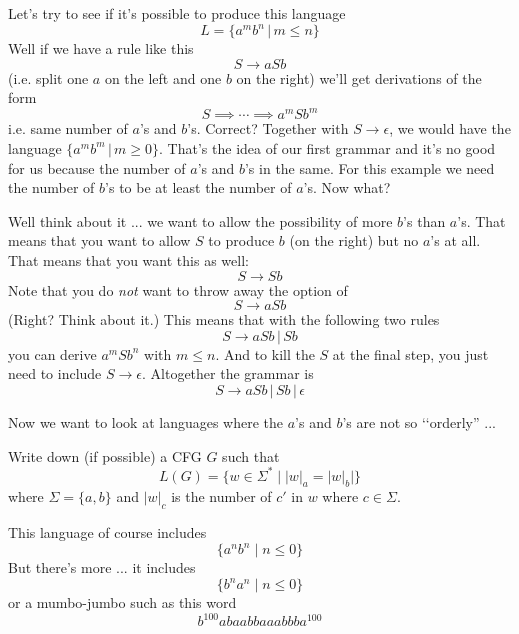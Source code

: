 \newpage
\begin{eg}
Let's try to see if it's possible to produce this language
\[
L = \{a^m b^n \,|\, m \leq n\}
\]
Well if we have a rule like this
\[
S \rightarrow aSb
\]
(i.e. split one $a$ on the left and one $b$ on the right) we'll get
derivations of the form
\[
S \implies \cdots \implies a^mSb^m
\]
i.e. same number of $a$'s and $b$'s. 
Correct?
Together with $S \rightarrow \epsilon$, we would have the language
$\{a^mb^m \,|\, m \geq 0\}$.
That's the idea of our first grammar and
it's no good for us because the number of $a$'s and $b$'s
in the same. For this example we need the number of $b$'s to be
at least the number of $a$'s.
Now what?

Well think about it ... we want to allow the possibility of more $b$'s
than $a$'s.
That means that you want to allow $S$ to produce $b$ (on the right)
but no $a$'s at all.
That means that you want this as well:
\[
S \rightarrow Sb
\]
Note that you do \textit{ not} want to throw away the option of 
\[
S \rightarrow aSb
\]
(Right? Think about it.)
This means that with the following two rules
\[
S \rightarrow aSb \,|\, Sb
\]
you can derive $a^mSb^n$ with $m \leq n$.
And to kill the $S$ at the final step,
you just need to include $S \rightarrow \epsilon$.
Altogether the grammar is 
\[
S \rightarrow aSb \,|\, Sb \,|\, \epsilon
\]
\end{eg}





\vspace{2in}




\vspace{2in}


\vspace{2in}

\newpage
Now we want to look at languages where the $a$'s and $b$'s are not so
\lq\lq orderly'' ...

\begin{eg}
Write down (if possible) a CFG $G$ such that
\[
L(G) = \{w \in \Sigma^* \mid |w|_a = |w|_b |
\}
\]
where $\Sigma = \{a, b\}$ and $|w|_c$ is the number of $c'$  in $w$
where $c \in \Sigma$.
\end{eg}

This language of course includes 
\[
\{a^n b^n \mid n \leq 0\}
\]
But there's more ... it includes
\[
\{b^n a^n \mid n \leq 0\}
\]
or a mumbo-jumbo such as this word
\[
b^{100}abaabbaaabbba^{100}
\]


